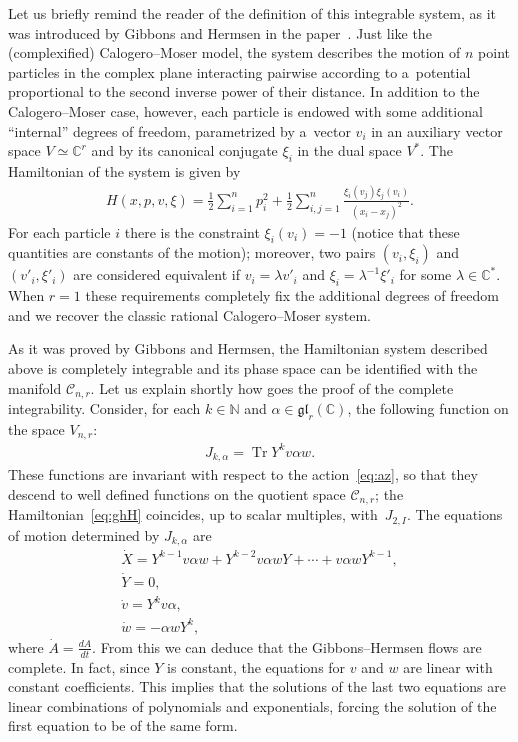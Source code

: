 \documentclass[11pt]{article}
\newcommand{\bb}[1]{\mathbb{#1}}
\DeclareMathOperator{\tr}{Tr}
\begin{document}
Let us brief\/ly remind the reader of the def\/inition of this integrable system, as it was introduced by
Gibbons and Hermsen in the paper~\cite{gh84}.
Just like the (complexif\/ied) Calogero--Moser model, the system describes the motion of $n$ point
particles in the complex plane interacting pairwise according to a~potential proportional to the second
inverse power of their distance.
In addition to the Calogero--Moser case, however, each particle is endowed with some additional
``internal'' degrees of freedom, parametrized by a~vector \(v_{i}\) in an auxiliary vector space
$V\simeq\bb{C}^r$ and by its canonical conjugate \(\xi_{i}\) in the dual space $V^{\ast}$.
The Hamiltonian of the system is given by
\begin{gather}
\label{eq:ghH}
H(x,p,v,\xi)=\frac{1}{2}\sum_{i=1}^{n}p_{i}^{2}+\frac{1}{2}\sum_{i,j=1}^{n}\frac{\xi_i(v_j)\xi_j(v_i)}
{(x_i-x_j)^{2}}.
\end{gather}
For each particle \(i\) there is the constraint $\xi_{i}(v_{i})=-1$ (notice that these quantities are
constants of the motion); moreover, two pairs \((v_{i},\xi_{i})\) and \((v'_{i},\xi'_{i})\) are considered
equivalent if \(v_{i} = \lambda v'_{i}\) and \(\xi_{i} = \lambda^{-1}\xi'_{i}\) for some \(\lambda\in
\bb{C}^{*}\).
When \(r=1\) these requirements completely f\/ix the additional degrees of freedom and we recover the
classic rational Calogero--Moser system.

As it was proved by Gibbons and Hermsen, the Hamiltonian system described above is completely integrable
and its phase space can be identif\/ied with the manifold \(\mathcal{C}_{n,r}\).
Let us explain shortly how goes the proof of the complete integrability.
Consider, for each \(k\in \bb{N}\) and \(\alpha\in \mathfrak{gl}_{r}(\bb{C})\), the following function on
the space \(V_{n,r}\):
\begin{gather}
\label{eq:fh}
J_{k,\alpha}=\tr Y^{k}v\alpha w.
\end{gather}
These functions are invariant with respect to the action~\eqref{eq:az}, so that they descend to well
def\/ined functions on the quotient space \(\mathcal{C}_{n,r}\); the Hamiltonian~\eqref{eq:ghH} coincides,
up to scalar multiples, with~$J_{2,I}$.
The equations of motion determined by \(J_{k,\alpha}\) are
\begin{gather*}
\dot{X}=Y^{k-1}v\alpha w+Y^{k-2}v\alpha wY+\cdots +v\alpha wY^{k-1},
\\
\dot{Y}=0,
\\
\dot{v}=Y^kv\alpha,
\\
\dot{w}=-\alpha wY^{k},
\end{gather*}
where $\dot{A}=\frac{dA}{dt}$.
From this we can deduce that the Gibbons--Hermsen f\/lows are complete.
In fact, since $Y$ is constant, the equations for $v$ and $w$ are linear with constant coef\/f\/icients.
This implies that the solutions of the last two equations are linear combinations of polynomials and
exponentials, forcing the solution of the f\/irst equation to be of the same form.
\end{document}
